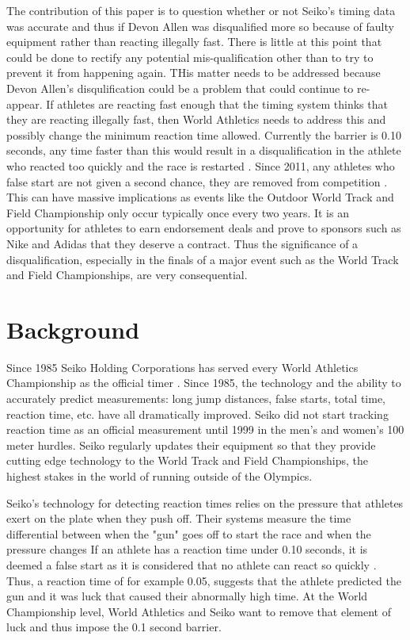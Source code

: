 \documentclass[12pt, letterpaper, titlepage]{article}
\begin{document}
The contribution of this paper is to question whether or not Seiko's timing data
was accurate and thus if Devon Allen was disqualified more so because of faulty
equipment rather than reacting illegally fast.  There is little at this point
that could be done to rectify any potential mis-qualification other than to try
to prevent it from happening again.  THis matter needs to be addressed because Devon Allen's 
disqulification could be a problem that could continue to re-appear.  If athletes
are reacting fast enough that the timing system thinks that they are reacting
illegally fast, then World Athletics needs to address this and possibly change
the minimum reaction time allowed.  Currently the barrier is 0.10 seconds, any time
faster than this would result in a disqualification in the athlete who reacted too
quickly and the race is restarted \citep{Seiko-Timing}.  Since 2011, any athletes who false 
start are not given a second chance, they are removed from competition \citep{False-Start}.  
This can have massive implications as events like the Outdoor World Track and Field Championship 
only occur typically once every two years.  It is an opportunity for athletes to earn endorsement
deals and prove to sponsors such as Nike and Adidas that
they deserve a contract.  Thus the significance of a disqualification, especially in the finals 
of a major event such as the World Track and Field Championships, are very
consequential.  

\section{Background}
\label{sec:Background}
Since 1985 Seiko Holding Corporations has served every World Athletics Championship
as the official timer \citep{Seiko}.  Since 1985, the technology and the ability
to accurately predict measurements: long jump distances, false starts, total time,
reaction time, etc. have all dramatically improved.  Seiko did not start tracking
reaction time as an official measurement until 1999 in the men's and women's 100 meter
hurdles.  Seiko regularly updates their equipment so that they provide cutting edge
technology to the World Track and Field Championships, the highest stakes in the world
of running outside of the Olympics.

Seiko's technology for detecting reaction times relies on the pressure that athletes
exert on the plate when they push off.  Their systems measure the time differential
between when the "gun" goes off to start the race and when the pressure changes 
\citep{Seiko}  If an athlete has a reaction time under 0.10 seconds, it is deemed a 
false start as it is considered that no athlete can react so quickly \citep{Seiko-Timing}.  
Thus, a reaction time of for example 0.05, suggests that the athlete predicted the gun and it
was luck that caused their abnormally high time.  At the World Championship level,
World Athletics and Seiko want to remove that element of luck and thus impose the 0.1
second barrier.
\end{document}
